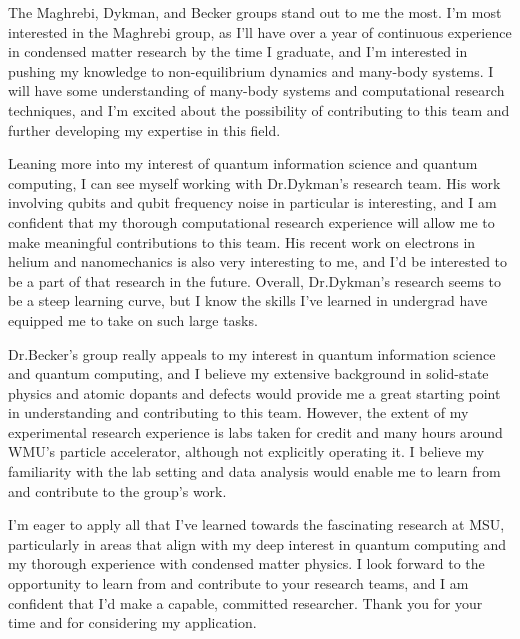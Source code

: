 \documentclass[11pt]{article}
\newcommand{\schoolabbr}{MSU}
\begin{document}
The Maghrebi, Dykman, and Becker groups stand out to me the most. I'm most interested in the Maghrebi group, as I'll have over a year of continuous experience in condensed matter research by the time I graduate, and I'm interested in pushing my knowledge to non-equilibrium dynamics and many-body systems. I will have some understanding of many-body systems and computational research techniques, and I'm excited about the possibility of contributing to this team and further developing my expertise in this field.

Leaning more into my interest of quantum information science and quantum computing, I can see myself working with Dr.\@ Dykman's research team. His work involving qubits and qubit frequency noise in particular is interesting, and I am confident that my thorough computational research experience will allow me to make meaningful contributions to this team. His recent work on electrons in helium and nanomechanics is also very interesting to me, and I'd be interested to be a part of that research in the future. Overall, Dr.\@ Dykman's research seems to be a steep learning curve, but I know the skills I've learned in undergrad have equipped me to take on such large tasks.

Dr.\@ Becker's group really appeals to my interest in quantum information science and quantum computing, and I believe my extensive background in solid-state physics and atomic dopants and defects would provide me a great starting point in understanding and contributing to this team. However, the extent of my experimental research experience is labs taken for credit and many hours around WMU's particle accelerator, although not explicitly operating it. I believe my familiarity with the lab setting and data analysis would enable me to learn from and contribute to the group's work.

I'm eager to apply all that I've learned towards the fascinating research at \schoolabbr{}, particularly in areas that align with my deep interest in quantum computing and my thorough experience with condensed matter physics. I look forward to the opportunity to learn from and contribute to your research teams, and I am confident that I'd make a capable, committed researcher. Thank you for your time and for considering my application.
\end{document}
